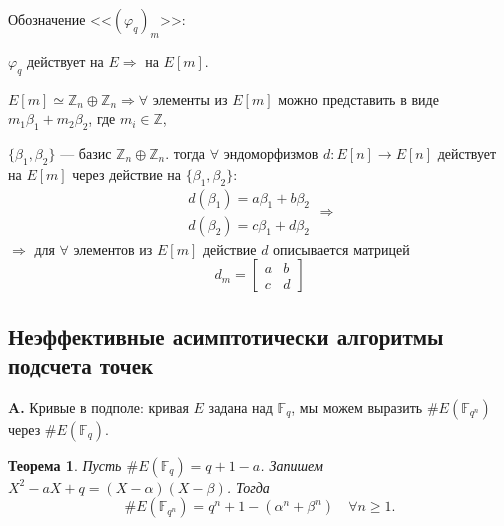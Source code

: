 \documentclass[12pt]{article}
\newcommand{\Z}{{{\mathbb Z}}}
\newcommand{\F}{{{\mathbb F}}}
\newtheorem{theorem}{Теорема}
\theoremstyle{definition}
\theoremstyle{definition}
\theoremstyle{definition}
\begin{document}
Обозначение <<${( {{\varphi _q}} )_m}$>>: 

${\varphi _q}$ действует на $E \Rightarrow $ на $E[ m ]$.

$E[ m ] \simeq {\Z_n} \oplus {\Z_n} \Rightarrow \forall $ элементы из $E[ m ]$ можно представить в виде ${m_1}{\beta _1} + {m_2}{\beta _2}$, где ${m_i} \in \Z$, 

$\{ {{\beta _1},{\beta _2}} \}$ — базис ${\Z_n} \oplus {\Z_n}$. тогда $\forall $ эндоморфизмов $d: E[ n ] \to E[ n ]$ действует на $E[ m ]$ через действие на $\{ {{\beta _1},{\beta _2}} \}$:  
$$
    \begin{array}{*{20}{c}}
    {d( \beta _1 ) = a{\beta _1} + b{\beta _2}} \\ 
    {d( \beta _2 ) = c{\beta _1} + d{\beta _2}} 
    \end{array} \Rightarrow 
$$
$ \Rightarrow $ для $\forall $ элементов из $E[ m ]$ действие $d$ описывается матрицей
$${d_m} = \left[ {\begin{array}{*{20}{c}}
	a&b \\ 
	c&d 
	\end{array}} \right]
$$

\subsection{Неэффективные асимптотически алгоритмы подсчета точек}

\textbf{A.} Кривые в подполе: кривая $E$ задана над ${\F_q}$, мы можем выразить $\# E( \F_{q^n} )$ через $\# E( \F_q )$. 

\begin{theorem}
	Пусть $\# E( {{\F_q}} ) = q + 1 - a$. Запишем ${X^2} - aX + q = ( {X - \alpha} )( {X - \beta } )$. Тогда 
	$$
	\# E(\F_{q^n}) = {q^n} + 1 - ( \alpha^n+ \beta ^n )\quad \forall n \geqslant 1.
	$$
\end{theorem}
\end{document}
